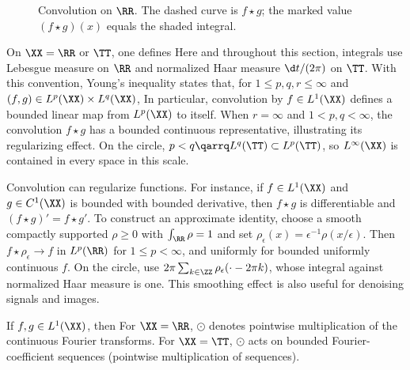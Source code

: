 \begin{figure}[tbp]
\centering
{}
\caption{Convolution on $\RR$. The dashed curve is $f\star g$; the marked value $(f\star g)(x)$ equals the shaded integral.}
\label{fig-review-fourier-convolution}
\end{figure}
On $\XX=\RR$ or $\TT$, one defines 
Here and throughout this section, integrals use Lebesgue measure on $\RR$ and normalized Haar measure $\d t/(2\pi)$ on $\TT$. With this convention, Young's inequality states that, for $1\leq p,q,r\leq\infty$ and $(f,g)\in L^p(\XX)\times L^q(\XX)$,
In particular, convolution by $f\in L^1(\XX)$ defines a bounded linear map from $L^p(\XX)$ to itself. When $r=\infty$ and $1<p,q<\infty$, the convolution $f\star g$ has a bounded continuous representative, illustrating its regularizing effect.
%
On the circle, $p<q \qarrq L^q(\TT) \subset L^p(\TT)$, so $L^\infty(\XX)$ is contained in every space in this scale.



Convolution can regularize functions. For instance, if $f \in L^1(\XX)$ and $g\in C^1(\XX)$ is bounded with bounded derivative, then $f \star g$ is differentiable and $(f \star g)'=f \star g'$. To construct an approximate identity, choose a smooth compactly supported $\rho\geq0$ with $\int_\RR\rho=1$ and set $\rho_\epsilon(x)=\epsilon^{-1}\rho(x/\epsilon)$. Then $f\star\rho_\epsilon\to f$ in $L^p(\RR)$ for $1\leq p<\infty$, and uniformly for bounded uniformly continuous $f$. On the circle, use $2\pi\sum_{k\in\ZZ}\rho_\epsilon(\cdot-2\pi k)$, whose integral against normalized Haar measure is one.
%
This smoothing effect is also useful for denoising signals and images.



\begin{prop}
If $f,g\in L^1(\XX)$, then
For $\XX=\RR$, $\odot$ denotes pointwise multiplication of the continuous Fourier transforms.
For $\XX=\TT$, $\odot$ acts on bounded Fourier-coefficient sequences (pointwise multiplication of sequences).
\end{prop}


